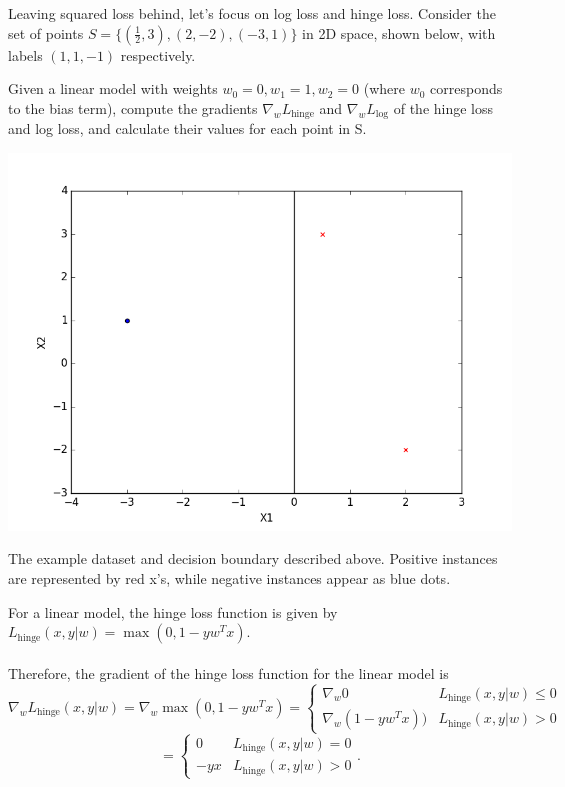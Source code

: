 \problem[9] %
Leaving squared loss behind, let's focus on log loss and hinge loss. Consider the set of points $S = \{(\frac{1}{2}, 3), (2, -2), (-3, 1)\}$ in 2D space, shown below, with labels $(1, 1, -1)$ respectively.

Given a linear model with weights $w_0 = 0, w_1 = 1, w_2 = 0$ (where $w_0$ corresponds to the bias term), compute the gradients $\nabla_{w}L_{\text{hinge}}$ and $\nabla_{w}L_{\text{log}}$ of the hinge loss and log loss, and calculate their values for each point in S.

\begin{center}
  \includegraphics[width=.8\textwidth]{SimpleDatasetWithDecisionBoundary.png}
\end{center}
\begin{small}
  The example dataset and decision boundary described above. Positive instances are
  represented by red x's, while negative instances appear as blue dots.
\end{small}

For a linear model, the hinge loss function is given by $L_{\text{hinge}}(x, y \vert w) = \max(0, 1 - y w^T x)$.\\
\\
Therefore, the gradient of the hinge loss function for the linear model is
\[ \nabla_{w}L_{\text{hinge}}(x, y \vert w) = \nabla_{w} \max(0, 1 - y w^T x) =
\begin{cases} 
   \nabla_{w} 0 & L_{\text{hinge}}(x, y \vert w) \leq 0 \\
   \nabla_{w}(1 - y w^T x)) & L_{\text{hinge}}(x, y \vert w) > 0
\end{cases} \]
\[ =
\begin{cases} 
   0 & L_{\text{hinge}}(x, y \vert w) = 0 \\
   - y x & L_{\text{hinge}}(x, y \vert w) > 0
\end{cases}. \]

